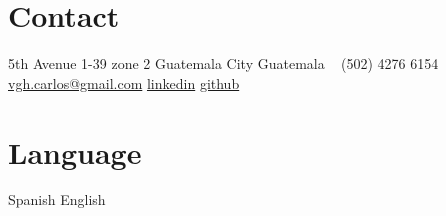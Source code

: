 \documentclass[]{friggeri-cv} %
\begin{document}


\begin{aside} %
\section{Contact}
5th Avenue 1-39 zone 2
Guatemala City
Guatemala
~
 (502) 4276 6154
~
\href{mailto:vgh.carlos@gmail.com}{vgh.carlos@gmail.com}
\href{https://www.linkedin.com/pub/carlos-hern\%C3\%A1ndez/87/1b1/157}{linkedin}
\href{https://github.com/learnercys}{github}
\section{Language}
Spanish
English
\end{aside}


\end{document}
